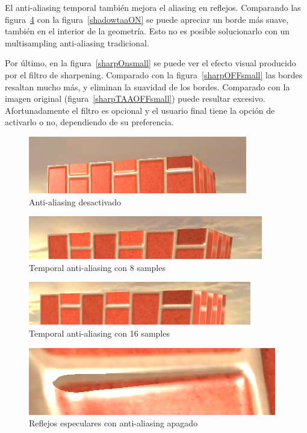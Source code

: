 \documentclass[withindex, glossary]{cam-thesis}
\begin{document}
El anti-aliasing temporal también mejora el aliasing en reflejos. Comparando las figura~\ref{shadowtaaOFF} con la figura~\ref{shadowtaaON} se puede apreciar un borde más suave, también en el interior de la geometría. Esto no es posible solucionarlo con un multisampling anti-aliasing tradicional.

Por último, en la figura~\ref{sharpOnsmall} se puede ver el efecto visual producido por el filtro de sharpening. Comparado con la figura~\ref{sharpOFFsmall} las bordes resaltan mucho más, y eliminan la suavidad de los bordes. Comparado con la imagen original (figura~\ref{sharpTAAOFFsmall}) puede resultar excesivo. Afortunadamente el filtro es opcional y el usuario final tiene la opción de activarlo o no, dependiendo de su preferencia.

\begin{figure}[!htbp]
    \includegraphics[width=.8\linewidth]{figures/taaoff.png}
    \caption{Anti-aliasing desactivado}
    \label{aaoff}
\end{figure}

\begin{figure}[!htbp]
    \includegraphics[width=.8\linewidth]{figures/taa8.png}
    \caption{Temporal anti-aliasing con 8 samples}
    \label{taa8}
\end{figure}

\begin{figure}[!htbp]
    \includegraphics[width=.8\linewidth]{figures/taa16.png}
    \caption{Temporal anti-aliasing con 16 samples}
    \label{taa16}
\end{figure}

\begin{figure}[!htbp]
    \includegraphics[width=.8\linewidth]{figures/shadowtaaOFF.png}
    \caption{Reflejos especulares con anti-aliasing apagado}
    \label{shadowtaaOFF}
\end{figure}
\end{document}
